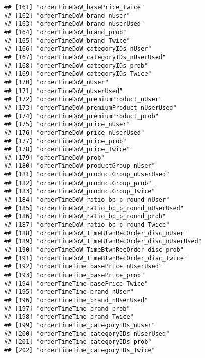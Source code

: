 \documentclass[10pt]{report}
\begin{document}
\begin{verbatim}
## [161] "orderTimeDoW_basePrice_Twice"                       
## [162] "orderTimeDoW_brand_nUser"                           
## [163] "orderTimeDoW_brand_nUserUsed"                       
## [164] "orderTimeDoW_brand_prob"                            
## [165] "orderTimeDoW_brand_Twice"                           
## [166] "orderTimeDoW_categoryIDs_nUser"                     
## [167] "orderTimeDoW_categoryIDs_nUserUsed"                 
## [168] "orderTimeDoW_categoryIDs_prob"                      
## [169] "orderTimeDoW_categoryIDs_Twice"                     
## [170] "orderTimeDoW_nUser"                                 
## [171] "orderTimeDoW_nUserUsed"                             
## [172] "orderTimeDoW_premiumProduct_nUser"                  
## [173] "orderTimeDoW_premiumProduct_nUserUsed"              
## [174] "orderTimeDoW_premiumProduct_prob"                   
## [175] "orderTimeDoW_price_nUser"                           
## [176] "orderTimeDoW_price_nUserUsed"                       
## [177] "orderTimeDoW_price_prob"                            
## [178] "orderTimeDoW_price_Twice"                           
## [179] "orderTimeDoW_prob"                                  
## [180] "orderTimeDoW_productGroup_nUser"                    
## [181] "orderTimeDoW_productGroup_nUserUsed"                
## [182] "orderTimeDoW_productGroup_prob"                     
## [183] "orderTimeDoW_productGroup_Twice"                    
## [184] "orderTimeDoW_ratio_bp_p_round_nUser"                
## [185] "orderTimeDoW_ratio_bp_p_round_nUserUsed"            
## [186] "orderTimeDoW_ratio_bp_p_round_prob"                 
## [187] "orderTimeDoW_ratio_bp_p_round_Twice"                
## [188] "orderTimeDoW_TimeBtwnRecOrder_disc_nUser"           
## [189] "orderTimeDoW_TimeBtwnRecOrder_disc_nUserUsed"       
## [190] "orderTimeDoW_TimeBtwnRecOrder_disc_prob"            
## [191] "orderTimeDoW_TimeBtwnRecOrder_disc_Twice"           
## [192] "orderTimeTime_basePrice_nUserUsed"                  
## [193] "orderTimeTime_basePrice_prob"                       
## [194] "orderTimeTime_basePrice_Twice"                      
## [195] "orderTimeTime_brand_nUser"                          
## [196] "orderTimeTime_brand_nUserUsed"                      
## [197] "orderTimeTime_brand_prob"                           
## [198] "orderTimeTime_brand_Twice"                          
## [199] "orderTimeTime_categoryIDs_nUser"                    
## [200] "orderTimeTime_categoryIDs_nUserUsed"                
## [201] "orderTimeTime_categoryIDs_prob"                     
## [202] "orderTimeTime_categoryIDs_Twice"                    

\end{verbatim}
\end{document}
